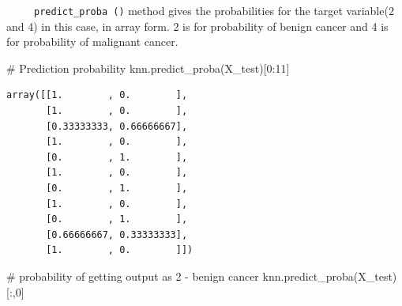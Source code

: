 \documentclass[
  letterpaper,
  DIV=11,
  numbers=noendperiod]{scrreprt}
\newenvironment{Shaded}{\begin{snugshade}}{\end{snugshade}}
\newcommand{\CommentTok}[1]{\textcolor[rgb]{0.37,0.37,0.37}{#1}}
\newcommand{\DecValTok}[1]{\textcolor[rgb]{0.68,0.00,0.00}{#1}}
\newcommand{\NormalTok}[1]{\textcolor[rgb]{0.00,0.23,0.31}{#1}}
\begin{document}
~~~~~\texttt{predict\_proba\ ()} method gives the probabilities for the
target variable(2 and 4) in this case, in array form. 2 is for
probability of benign cancer and 4 is for probability of malignant
cancer.

\begin{Shaded}
\begin{Highlighting}[]
\CommentTok{\# Prediction probability}
\NormalTok{knn.predict\_proba(X\_test)[}\DecValTok{0}\NormalTok{:}\DecValTok{11}\NormalTok{]}
\end{Highlighting}
\end{Shaded}

\begin{verbatim}
array([[1.        , 0.        ],
       [1.        , 0.        ],
       [0.33333333, 0.66666667],
       [1.        , 0.        ],
       [0.        , 1.        ],
       [1.        , 0.        ],
       [0.        , 1.        ],
       [1.        , 0.        ],
       [0.        , 1.        ],
       [0.66666667, 0.33333333],
       [1.        , 0.        ]])
\end{verbatim}

\begin{Shaded}
\begin{Highlighting}[]
\CommentTok{\# probability of getting output as 2 {-} benign cancer}
\NormalTok{knn.predict\_proba(X\_test)[:,}\DecValTok{0}\NormalTok{]}
\end{Highlighting}
\end{Shaded}
\end{document}
